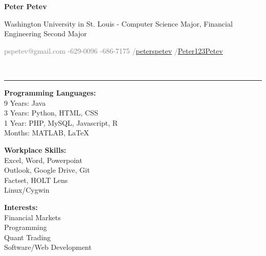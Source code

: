 \documentclass[12pt]{article}
\begin{document}
	\begin{titlepage}
		\small
			\begin{center}
				\centerline{{\Large \textbf{Peter Petev}}}
				\centerline{Washington University in St. Louis - Computer Science Major, Financial Engineering Second Major}
				\small
				\begin{minipage}[b]{\textwidth}
					\textcolor{gray}{\faEnvelope \space pspetev@gmail.com}\hfill
					\textcolor{gray}{\faMobilePhone {}-629-0096}\hfill
					\textcolor{gray}{\faPhoneSquare {}-686-7175}\hfill
					\textcolor{gray}{\faLinkedinSquare \slash \href{http://www.linkedin.com/in/peterspetev}{peterspetev}}\hfill
					\textcolor{gray}{\faGithubSquare \slash \href{http://www.github.com/Peter123Petev}{Peter123Petev}}
				\end{minipage}
			\end{center}
		\vspace{-15pt}
		\noindent\makebox[\linewidth]{\rule{\paperwidth}{0.4pt}}\vspace{5pt}
		\\\rule{\textwidth}{0.4pt}
		\begin{addmargin}[1em]{0em}
			\vspace{-10pt}
			\begin{center}
				\begin{minipage}[b]{0.4\textwidth}
					\textbf{Programming Languages:}\\ 9 Years: Java\\ 3 Years: Python, HTML, CSS\\ 1 Year: PHP, MySQL, Javascript, R\\Months: MATLAB, \LaTeX\\
				\end{minipage}%
				\begin{minipage}[b]{0.3\textwidth}
					\textbf{Workplace Skills:}\\ Excel, Word, Powerpoint\\ Outlook, Google Drive, Git\\ Factset, HOLT Lens\\Linux/Cygwin\\
				\end{minipage}%
				\begin{minipage}[b]{0.3\textwidth}
					\textbf{Interests:}\\ Financial Markets\\ Programming\\ Quant Trading\\ Software/Web Development\\

\end{minipage}
\end{center}
\end{addmargin}
\end{titlepage}
\end{document}

